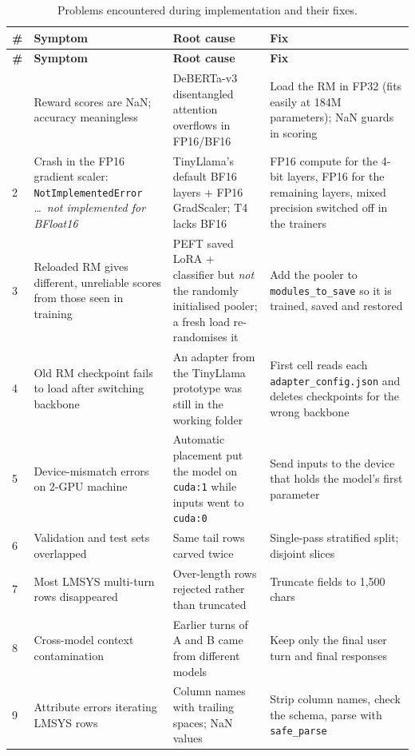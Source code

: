 {\footnotesize
\begin{longtable}{@{}L{0.5cm}L{4.0cm}L{4.3cm}L{5.0cm}@{}}
\caption[Implementation problems and fixes]{Problems encountered during implementation and their fixes.}\label{tab:fixes}\\
\toprule
\textbf{\#} & \textbf{Symptom} & \textbf{Root cause} & \textbf{Fix}\\
\midrule\endfirsthead
\toprule
\textbf{\#} & \textbf{Symptom} & \textbf{Root cause} & \textbf{Fix}\\
\midrule\endhead
\bottomrule{} & Reward scores are NaN; accuracy meaningless & DeBERTa-v3 disentangled attention overflows in FP16/BF16 & Load the RM in FP32 (fits easily at 184M parameters); NaN guards in scoring\\
2 & Crash in the FP16 gradient scaler: \texttt{NotImplementedError} \ldots\ \emph{not implemented for BFloat16} & TinyLlama's default BF16 layers + FP16 GradScaler; T4 lacks BF16 & FP16 compute for the 4-bit layers, FP16 for the remaining layers, mixed precision switched off in the trainers\\
3 & Reloaded RM gives different, unreliable scores from those seen in training & PEFT saved LoRA + classifier but \emph{not} the randomly initialised pooler; a fresh load re-randomises it & Add the pooler to \texttt{modules\_to\_save} so it is trained, saved and restored\\
4 & Old RM checkpoint fails to load after switching backbone & An adapter from the TinyLlama prototype was still in the working folder & First cell reads each \texttt{adapter\_config.json} and deletes checkpoints for the wrong backbone\\
5 & Device-mismatch errors on 2-GPU machine & Automatic placement put the model on \texttt{cuda:1} while inputs went to \texttt{cuda:0} & Send inputs to the device that holds the model's first parameter\\
6 & Validation and test sets overlapped & Same tail rows carved twice & Single-pass stratified split; disjoint slices\\
7 & Most LMSYS multi-turn rows disappeared & Over-length rows rejected rather than truncated & Truncate fields to 1,500 chars\\
8 & Cross-model context contamination & Earlier turns of A and B came from different models & Keep only the final user turn and final responses\\
9 & Attribute errors iterating LMSYS rows & Column names with trailing spaces; NaN values & Strip column names, check the schema, parse with \texttt{safe\_parse}\\

\end{longtable}}
